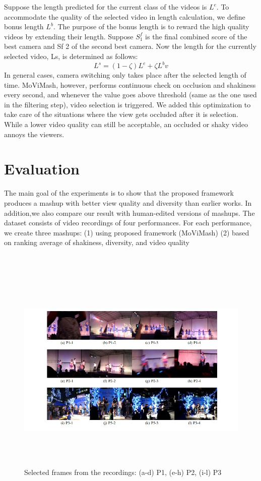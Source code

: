 \documentclass{sig-alternate}
\begin{document}
Suppose the length predicted for the current class of the videos is \(L^e\). To accommodate the quality of the selected video in length calculation, we deﬁne bonus length \(L^b\). The purpose of the bonus length is to reward the high quality videos by extending their length. Suppose \(S^f_1\) is the ﬁnal combined score of the best camera and Sf 2 of the second best camera. Now the length for the currently selected video, Ls, is determined as follows:
\begin{equation}
L^s = (1- \zeta)L^e + \zeta L^bv
\end{equation}
In general cases, camera switching only takes place after the selected length of time. MoViMash, however, performs continuous check on occlusion and shakiness every second, and whenever the value goes above threshold (same as the one used in the ﬁltering step), video selection is triggered. We added this optimization to take care of the situations where the view gets occluded after it is selection. While a lower video quality can still be acceptable, an occluded or shaky video annoys the viewers.

\section{Evaluation}
The main goal of the experiments is to show that the proposed framework produces a mashup with better view quality and diversity than earlier works. In addition,we also compare our result with human-edited versions of mashups. The dataset consists of video recordings of four performances. For each performance, we create three mashups: (1) using proposed framework (MoViMash) (2) based on ranking average of shakiness, diversity, and video quality\\ \\ \\


\begin{figure}[!htb]
  \includegraphics[width=\linewidth , height=10cm]{image6}
  \caption{Selected frames from the recordings: (a-d) P1, (e-h) P2, (i-l) P3}\label{fig:awesome_image1}
\endminipage

\end{figure}
\end{document}

